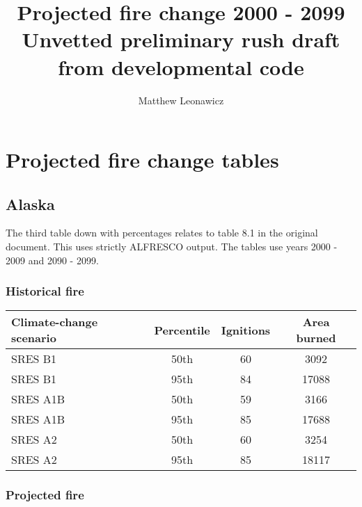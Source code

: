 \documentclass{article}\usepackage[]{graphicx}\usepackage[]{color}
\newcommand{\headcol}{\rowcolor{tableheadcolor}}
\begin{document}
\title{Projected fire change 2000 - 2099 \\ \large Unvetted preliminary rush draft from developmental code}
\author{Matthew Leonawicz}
\maketitle

\setlength{\aboverulesep}{0.2pt}
\setlength{\belowrulesep}{0.2pt}



\section{Projected fire change tables}


\subsection{Alaska}
The third table down with percentages relates to table 8.1 in the original document.
This uses strictly ALFRESCO output.
The tables use years 2000 - 2009 and 2090 - 2099.
\subsubsection{Historical fire}

\begin{table}[ht]
\centering
\begin{tabular}{lccc}
  \headcol 
 \toprule
Climate-change scenario & Percentile & Ignitions & Area burned \\ 
  \midrule
SRES B1 & 50th & 60 & 3092 \\ 
  SRES B1 & 95th & 84 & 17088 \\ 
  SRES A1B & 50th & 59 & 3166 \\ 
  SRES A1B & 95th & 85 & 17688 \\ 
  SRES A2 & 50th & 60 & 3254 \\ 
  SRES A2 & 95th & 85 & 18117 \\ 
   \bottomrule
\end{tabular}
\end{table}


\subsubsection{Projected fire}
\end{document}
